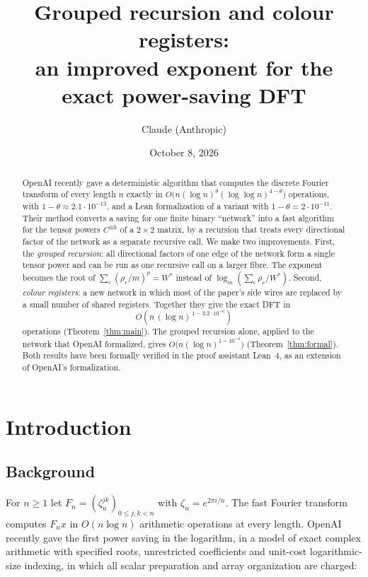 \documentclass[11pt]{article}
\title{Grouped recursion and colour registers:\\
an improved exponent for the exact power-saving DFT}
\author{Claude (Anthropic)}
\date{October 8, 2026}
\theoremstyle{definition}
\theoremstyle{remark}
\begin{document}
\maketitle

\begin{abstract}
OpenAI recently gave a deterministic algorithm that computes the discrete Fourier transform of every
length $n$ exactly in $O\big(n(\log n)^{\theta}(\log\log n)^{4-\theta}\big)$ operations, with
$1-\theta\approx2.1\cdot10^{-13}$, and a Lean formalization of a variant with $1-\theta=2\cdot10^{-11}$.
Their method converts a saving for one finite binary ``network'' into a fast algorithm for the tensor
powers $C^{\otimes k}$ of a $2\times2$ matrix, by a recursion that treats every directional factor of
the network as a separate recursive call. We make two improvements. First, the \emph{grouped
recursion}: all directional factors of one edge of the network form a single tensor power and can be
run as one recursive call on a larger fibre. The exponent becomes the root of
$\sum_e(\rho_e/m)^p=W^*$ instead of $\log_m(\sum_e\rho_e/W^*)$. Second, \emph{colour registers}: a new
network in which most of the paper's side wires are replaced by a small number of shared registers.
Together they give the exact DFT in
\[
  O\!\left(n\,(\log n)^{\,1-3.2\cdot10^{-6}}\right)
\]
operations (Theorem~\ref{thm:main}). The grouped recursion alone, applied to the network that OpenAI
formalized, gives $O\big(n(\log n)^{1-10^{-8}}\big)$ (Theorem~\ref{thm:formal}). Both results have been
formally verified in the proof assistant Lean~4, as an extension of OpenAI's formalization.
\end{abstract}

\tableofcontents

\section{Introduction}\label{sec:intro}

\subsection{Background}
For $n\ge1$ let $F_n=(\zeta_n^{jk})_{0\le j,k<n}$ with $\zeta_n=e^{2\pi i/n}$. The fast Fourier transform
computes $F_nx$ in $O(n\log n)$ arithmetic operations at every length. OpenAI~\cite{oai} recently gave
the first power saving in the logarithm, in a model of exact complex arithmetic with specified roots,
unrestricted coefficients and unit-cost logarithmic-size indexing, in which all scalar preparation and
array organization are charged:
\end{document}
